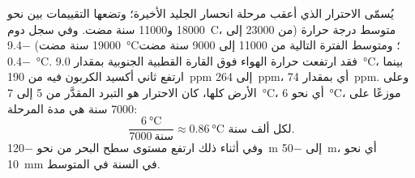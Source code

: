\begin{example}
يُسمّى الاحترار الذي أعقب  مرحلة انحسار الجليد
الأخيرة؛ وتضعها التقييمات بين نحو \num{18000}
و\num{11000} سنة مضت. وفي سجل دوم~C، متوسط درجة حرارة
 (من \num{23000} إلى \num{19000} سنة مضت)
\qty{-9.4}{\degreeCelsius}؛ ومتوسط الفترة التالية من \num{11000} إلى
\num{9000} سنة مضت \qty{-0.4}{\degreeCelsius}. فقد ارتفعت حرارة الهواء فوق القارة القطبية الجنوبية
بمقدار \qty{9.0}{\degreeCelsius}، بينما ارتفع ثاني أكسيد الكربون فيه من
\qty{190}{ppm} إلى \qty{264}{ppm}، أي بمقدار \qty{74}{ppm}. وعلى الأرض كلها،
كان الاحترار هو التبرد المقدَّر من 5 إلى \qty{7}{\degreeCelsius}، أي نحو
\qty{6}{\degreeCelsius}، موزعًا على \num{7000} سنة هي مدة المرحلة:
\[
  \frac{\qty{6}{\degreeCelsius}}{\num{7000}\ \text{سنة}} \approx
  \qty{0.86}{\degreeCelsius} \text{ لكل ألف سنة.}
\]
وفي أثناء ذلك ارتفع مستوى سطح البحر من نحو \qty{-120}{m} إلى \qty{-50}{m}، أي نحو
\qty{10}{mm} في السنة في المتوسط.
\end{example}

